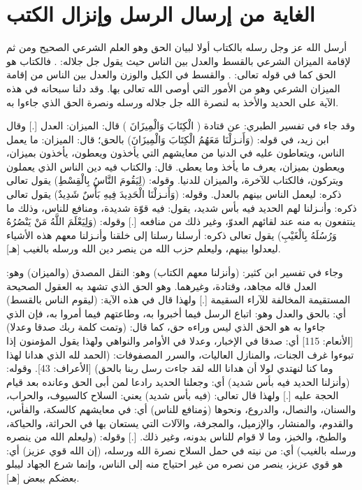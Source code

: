 \section{الغاية من إرسال الرسل وإنزال الكتب}

أرسل الله عز وجل رسله بالكتاب أولا لبيان الحق وهو العلم الشرعي الصحيح ومن ثم لإقامة الميزان الشرعي بالقسط والعدل بين الناس حيث يقول جل جلاله:
\quranayah*[57][25]{\footnotesize \surahname*[57]}. فالكتاب هو الحق كما في قوله تعالى: \quranayah*[2][144][21]{\footnotesize \surahname*[2]}. والقسط في الكيل والوزن والعدل بين الناس من إقامة الميزان الشرعي وهو من الأمور التي أوصى الله تعالى بها. وقد دلنا سبحانه في هذه الآية على الحديد والأخذ به لنصرة الله جل جلاله ورسله ونصرة الحق الذي جاءوا به. 

وقد جاء في تفسير الطبري: عن قتادة ( الْكِتَابَ وَالْمِيزَانَ ) قال: الميزان: العدل [.] وقال ابن زيد، في قوله: (وَأَنـزلْنَا مَعَهُمُ الْكِتَابَ وَالْمِيزَانَ) بالحق؛ قال: الميزان: ما يعمل الناس، ويتعاطون عليه في الدنيا من معايشهم التي يأخذون ويعطون، يأخذون بميزان، ويعطون بميزان، يعرف ما يأخذ وما يعطي. قال: والكتاب فيه دين الناس الذي يعملون ويتركون، فالكتاب للآخرة، والميزان للدنيا. وقوله: (لِيَقُومَ النَّاسُ بِالْقِسْطِ) يقول تعالى ذكره: ليعمل الناس بينهم بالعدل. وقوله: (وَأَنـزلْنَا الْحَدِيدَ فِيهِ بَأْسٌ شَدِيدٌ) يقول تعالى ذكره: وأنـزلنا لهم الحديد فيه بأس شديد، يقول: فيه قوّة شديدة، ومنافع للناس، وذلك ما ينتفعون به منه عند لقائهم العدوّ، وغير ذلك من منافعه [.] وقوله: (وَلِيَعْلَمَ اللَّهُ مَنْ يَنْصُرُهُ وَرُسُلَهُ بِالْغَيْبِ) يقول تعالى ذكره: أرسلنا رسلنا إلى خلقنا وأنـزلنا معهم هذه الأشياء ليعدلوا بينهم، وليعلم حزب الله من ينصر دين الله ورسله بالغيب [هـ]. 

وجاء في تفسير ابن كثير: (وأنزلنا معهم الكتاب) وهو: النقل المصدق (والميزان) وهو: العدل قاله مجاهد، وقتادة، وغيرهما. وهو الحق الذي تشهد به العقول الصحيحة المستقيمة المخالفة للآراء السقيمة [.] ولهذا قال في هذه الآية: (ليقوم الناس بالقسط) أي: بالحق والعدل وهو: اتباع الرسل فيما أخبروا به، وطاعتهم فيما أمروا به، فإن الذي جاءوا به هو الحق الذي ليس وراءه حق، كما قال: (وتمت كلمة ربك صدقا وعدلا) [الأنعام: 115] أي: صدقا في الإخبار، وعدلا في الأوامر والنواهي \.ولهذا يقول المؤمنون إذا تبوءوا غرف الجنات، والمنازل العاليات، والسرر المصفوفات: (الحمد لله الذي هدانا لهذا وما كنا لنهتدي لولا أن هدانا الله لقد جاءت رسل ربنا بالحق) [الأعراف: 43]. وقوله: (وأنزلنا الحديد فيه بأس شديد) أي: وجعلنا الحديد رادعا لمن أبى الحق وعانده بعد قيام الحجة عليه [.] ولهذا قال تعالى: (فيه بأس شديد) يعني: السلاح كالسيوف، والحراب، والسنان، والنصال، والدروع، ونحوها \.(ومنافع للناس) أي: في معايشهم كالسكة، والفأس، والقدوم، والمنشار، والإزميل، والمجرفة، والآلات التي يستعان بها في الحراثة، والحياكة، والطبخ، والخبز، وما لا قوام للناس بدونه، وغير ذلك. [.] وقوله: (وليعلم الله من ينصره ورسله بالغيب) أي: من نيته في حمل السلاح نصرة الله ورسله، (إن الله قوي عزيز) أي: هو قوي عزيز، ينصر من نصره من غير احتياج منه إلى الناس، وإنما شرع الجهاد ليبلو بعضكم ببعض [هـ].


